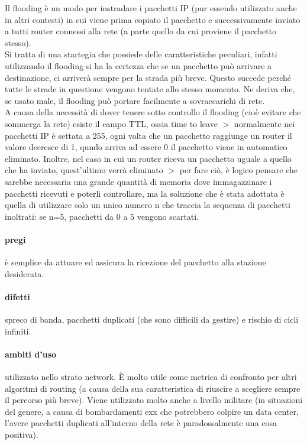 \documentclass{article}
\begin{document}
Il flooding è un modo per instradare i pacchetti IP (pur essendo utilizzato
anche in altri contesti) in cui viene prima copiato il pacchetto e
successivamente inviato a tutti router connessi alla rete (a parte quello da cui
proviene il pacchetto stesso).\\
Si tratta di una startegia che possiede delle caratteristiche peculiari, infatti
utilizzando il flooding si ha la certezza che se un pacchetto può arrivare a
destinazione, ci arriverà sempre per la strada più breve. Questo succede perché
tutte le strade in questione vengono tentate allo stesso momento. Ne deriva che,
se usato male, il flooding può portare facilmente a sovraccarichi di rete.\\
A causa della necessità di dover tenere sotto controllo il flooding (cioè
evitare che sommerga la rete) esiste il campo TTL, ossia time to leave $>$
normalmente nei pacchetti IP è settata a 255, ogni volta che un pacchetto
raggiunge un router il valore decresce di 1, qundo arriva ad essere 0 il
pacchetto viene in automatico eliminato. Inoltre, nel caso in cui un router
riceva un pacchetto uguale a quello che ha inviato, quest'ultimo verrà eliminato
$>$ per fare ciò, è logico pensare che sarebbe necessaria una grande quantità di
memoria dove immagazzinare i pacchetti ricevuti e poterli controllare, ma la
soluzione che è stata adottata è quella di utilizzare solo un unico numero n che
traccia la sequenza di pacchetti inoltrati: se n=5, pacchetti da 0 a 5 vengono
scartati.

\paragraph{pregi} è semplice da attuare ed assicura la ricezione del pacchetto
alla stazione desiderata.

\paragraph{difetti} spreco di banda, pacchetti duplicati (che sono difficili da
gestire) e rischio di cicli infiniti.

\paragraph{ambiti d'uso} utilizzato nello strato network. È molto utile come
metrica di confronto per altri algoritmi di routing (a causa della sua
caratteristica di riuscire a scegliere sempre il percorso più breve). Viene
utilizzato molto anche a livello militare (in situazioni del genere, a causa di
bombardamenti exx che potrebbero colpire un data center, l'avere pacchetti
duplicati all'interno della rete è paradossalmente una cosa positiva).
\end{document}
